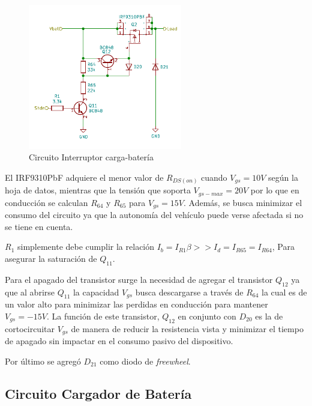\documentclass[10pt,a4paper]{article}
\begin{document}
\begin{figure}[h!]
	\begin{center}
		\includegraphics[width=0.6\textwidth]{kcd_bat_load_switch.pdf}
		\caption{Circuito Interruptor carga-batería}
		\label{load_sw_sch}
	\end{center}
\end{figure}
\FloatBarrier

El IRF9310PbF adquiere el menor valor de $R_{DS(on)}$ cuando $V_{gs} = 10V$
según la hoja de datos\cite{IRF9310}, mientras que la tensión que soporta
$V_{gs-max}=20V$ por lo que en conducción se calculan $R_{64}$ y $R_{65}$ para
$V_{gs}=15V$.
Además, se busca minimizar el consumo del circuito ya que la autonomía del
vehículo puede verse afectada si no se tiene en cuenta.

$R_1$ simplemente debe cumplir la relación $I_b = I_{R1} \beta >> I_d = I_{R65}
= I_{R64}$, Para asegurar la saturación de $Q_{11}$. 

Para el apagado del transistor surge la necesidad de agregar el transistor
$Q_{12}$ ya que al abrirse $Q_{11}$ la capacidad $V_{gs}$ busca descargarse a
través de $R_{64}$ la cual es de un valor alto para minimizar las perdidas en
conducción para mantener $V_{gs}=-15V$. La función de este transistor, $Q_{12}$
en conjunto con $D_{20}$ es la de cortocircuitar $V_{gs}$ de manera de reducir
la resistencia vista y minimizar el tiempo de apagado sin impactar en el consumo
pasivo del dispositivo.

Por último se agregó $D_{21}$ como diodo de \emph{freewheel}.

\subsection{Circuito Cargador de Batería}
\end{document}
